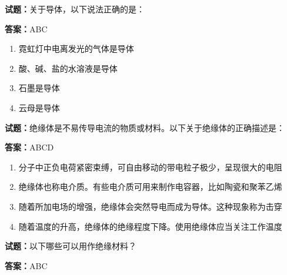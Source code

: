 \documentclass{ctexbook}
\begin{document}




\vspace{1em}

\textbf{试题：}关于导体，以下说法正确的是： 

\textbf{答案：}ABC 

\begin{enumerate}[leftmargin=3em]
  \item 霓虹灯中电离发光的气体是导体 

  \item 酸、碱、盐的水溶液是导体 

  \item 石墨是导体 

  \item 云母是导体 

\end{enumerate}





\vspace{1em}

\textbf{试题：}绝缘体是不易传导电流的物质或材料。以下关于绝缘体的正确描述是： 

\textbf{答案：}ABCD 

\begin{enumerate}[leftmargin=3em]
  \item 分子中正负电荷紧密束缚，可自由移动的带电粒子极少，呈现很大的电阻 

  \item 绝缘体也称电介质。有些电介质可用来制作电容器，比如陶瓷和聚苯乙烯 

  \item 随着所加电场的增强，绝缘体会突然导电而成为导体。这种现象称为击穿 

  \item 随着温度的升高，绝缘体的绝缘程度下降。使用绝缘体应当关注工作温度 

\end{enumerate}





\vspace{1em}

\textbf{试题：}以下哪些可以用作绝缘材料？ 

\textbf{答案：}ABC 
\end{document}
